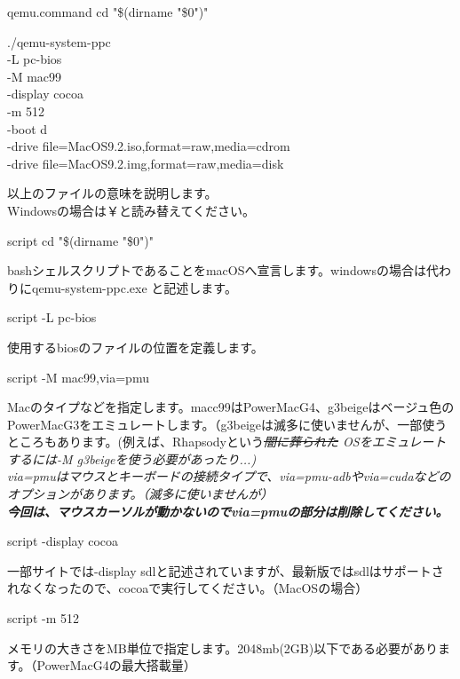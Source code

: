 \documentclass[b5paper,9pt,platex,dvipdfmx]{jsarticle}
\begin{document}
\begin{multicols*}{3}
{\begin{itembox}{qemu.command}
cd "\$(dirname "\$0")"

./qemu-system-ppc \ \\
-L pc-bios \ \\
-M mac99 \ \\
-display cocoa \ \\
-m 512 \ \\
-boot d \ \\
-drive file=MacOS9.2.iso,format=raw,media=cdrom \ \\
-drive file=MacOS9.2.img,format=raw,media=disk \\
\end{itembox}
以上のファイルの意味を説明します。\\
Windowsの場合は￥と読み替えてください。\\
\begin{itembox}{script}
cd "\$(dirname "\$0")"\\
\end{itembox}
bashシェルスクリプトであることをmacOSへ宣言します。windowsの場合は代わりにqemu-system-ppc.exe と記述します。\\
\begin{itembox}{script}
-L pc-bios
\end{itembox}
使用するbiosのファイルの位置を定義します。\\
\begin{itembox}{script}
-M mac99,via=pmu 
\end{itembox}
Macのタイプなどを指定します。macc99はPowerMacG4、g3beigeはベージュ色のPowerMacG3をエミュレートします。（g3beigeは滅多に使いませんが、一部使うところもあります。(例えば、Rhapsodyという\it  \sout{闇に葬られた} \sc OSをエミュレートするには-M g3beigeを使う必要があったり...)\\
via=pmuはマウスとキーボードの接続タイプで、via=pmu-adbやvia=cudaなどのオプションがあります。（滅多に使いませんが）\\
\textbf{今回は、マウスカーソルが動かないのでvia=pmuの部分は削除してください。}\\
\begin{itembox}{script}
-display cocoa 
\end{itembox}
一部サイトでは-display sdlと記述されていますが、最新版ではsdlはサポートされなくなったので、cocoaで実行してください。（MacOSの場合）\\
\begin{itembox}{script}
-m 512 
\end{itembox}
メモリの大きさをMB単位で指定します。2048mb(2GB)以下である必要があります。（PowerMacG4の最大搭載量）\\
}
\end{multicols*}
\end{document}
